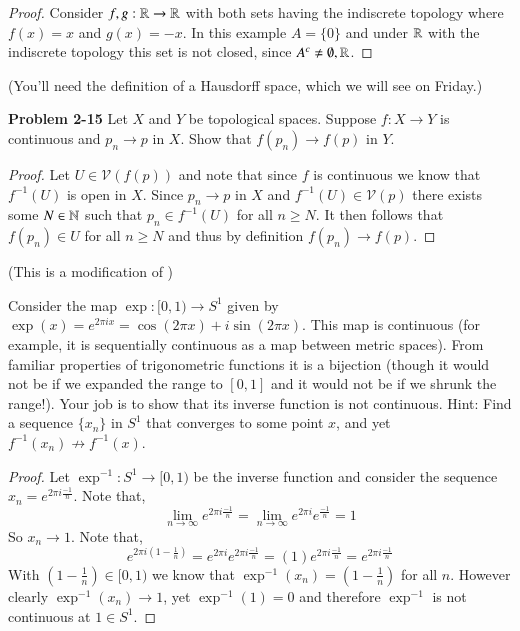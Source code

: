 \documentclass[minion]{homework651}
\begin{document}
\begin{problems}
\begin{proof}
    Consider $f, g: \mathbb R \to \mathbb R$ with both sets having the indiscrete topology where $f(x) = x$ and $g(x) =  - x$.
    In this example $A = \{0\}$ and under $\mathbb R$ with the indiscrete topology this set is not closed, since $A^c \neq \emptyset, \mathbb R$. 
\end{proof}

(You'll need the definition of a Hausdorff space, which we will see on Friday.)

\problem \textbf{Problem 2-15} Let $X$ and $Y$ be topological spaces. Suppose $f: X \to Y$ is continuous and $p_n \to p$ in $X$.
Show that $f(p_n) \to f(p)$ in $Y$.

\begin{proof}
Let $U \in \mathcal{V}(f(p))$ and note that since $f$ is continuous we know that 
$f^{-1}(U)$ is open in $X$. Since $p_n \to p$ in $X$ and $f^{-1}(U) \in \mathcal{V}(p)$ there exists some $N \in \mathbb N$ such that $p_n \in f^{-1}(U)$ for all 
$n \geq N$. It then follows that $f(p_n) \in U$ for all $n \geq N$ and thus by definition $f(p_n) \to f(p)$.

\end{proof}



\problem (This is a modification of )

Consider the map $\exp:[0,1)\rightarrow S^1$ given by $\exp(x) = e^{2\pi i x} = \cos(2\pi x) + i\sin(2 \pi x)$.
This map is continuous (for example, it is sequentially continuous as 
a map between metric spaces).  From familiar properties of trigonometric
functions it is a bijection (though it would not be if we expanded the range to $[0,1]$
and it would not be if we shrunk the range!).  
Your job is to show that its inverse function is
not continuous.  Hint:  Find a sequence $\{x_n\}$ in $S^1$ that converges to some point $x$,
and yet $f^{-1}(x_n)\not\rightarrow f^{-1}(x)$.

\begin{proof} Let $\exp^{-1}: S^1\rightarrow [0,1)$ be the inverse function and consider the sequence 
    $x_n = e^{2\pi i \frac{-1}{n}}$. Note that,
    \begin{equation*}
        \lim_{n\to \infty}  e^{2\pi i \frac{-1}{n}} = \lim_{n\to \infty} e^{2\pi i}e^{\frac{-1}{n}} = 1
    \end{equation*}
    So $x_n \to 1$. Note that, 
    \begin{equation*}
        e^{2\pi i(1 - \frac{1}{n})} =  e^{2\pi i}e^{2\pi i \frac{-1}{n}} =(1) e^{2\pi i \frac{-1}{n}}= e^{2\pi i \frac{-1}{n}} 
    \end{equation*}
    With $(1 - \frac{1}{n}) \in [0, 1)$ we know that $\exp^{-1}(x_n) = (1 - \frac{1}{n})$ for all $n$. However clearly $\exp^{-1}(x_n) \to 1$, yet $\exp^{-1}(1) = 0$ and therefore 
    $\exp^{-1}$ is not continuous at $1 \in S^1$. 

\end{proof}

\end{problems}
\end{document}

